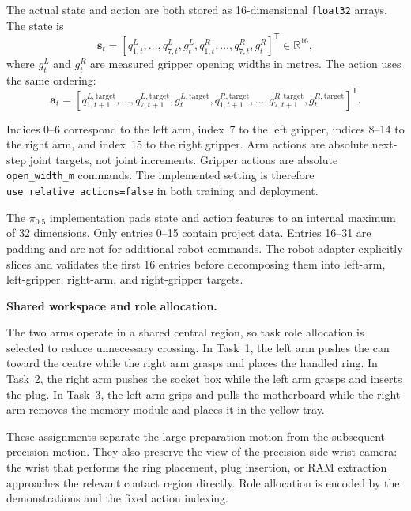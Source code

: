 The actual state and action are both stored as 16-dimensional \texttt{float32} arrays. The state is
\begin{equation}
\mathbf{s}_t=
\left[
q^{L}_{1,t},\ldots,q^{L}_{7,t},g^{L}_t,
q^{R}_{1,t},\ldots,q^{R}_{7,t},g^{R}_t
\right]^{\mathsf T}
\in\mathbb{R}^{16},
\label{eq:ch4-bimanual-state}
\end{equation}
where \(g^{L}_t\) and \(g^{R}_t\) are measured gripper opening widths in metres. The action uses the same ordering:
\begin{equation}
\mathbf{a}_t=
\left[
q^{L,\mathrm{target}}_{1,t+1},\ldots,q^{L,\mathrm{target}}_{7,t+1},
g^{L,\mathrm{target}}_t,
q^{R,\mathrm{target}}_{1,t+1},\ldots,q^{R,\mathrm{target}}_{7,t+1},
g^{R,\mathrm{target}}_t
\right]^{\mathsf T}.
\label{eq:ch4-bimanual-action}
\end{equation}

Indices 0--6 correspond to the left arm, index~7 to the left gripper, indices 8--14 to the right arm, and index~15 to the right gripper. Arm actions are absolute next-step joint targets, not joint increments. Gripper actions are absolute \texttt{open\_width\_m} commands. The implemented setting is therefore \texttt{use\_relative\_actions=false} in both training and deployment.

The $\pi_{0.5}$ implementation pads state and action features to an internal maximum of 32 dimensions. Only entries 0--15 contain project data. Entries 16--31 are padding and are not for additional robot commands. The robot adapter explicitly slices and validates the first 16 entries before decomposing them into left-arm, left-gripper, right-arm, and right-gripper targets.

\medskip
\noindent\textbf{Shared workspace and role allocation.}

The two arms operate in a shared central region, so task role allocation is selected to reduce unnecessary crossing. In Task~1, the left arm pushes the can toward the centre while the right arm grasps and places the handled ring. In Task~2, the right arm pushes the socket box while the left arm grasps and inserts the plug. In Task~3, the left arm grips and pulls the motherboard while the right arm removes the memory module and places it in the yellow tray.

These assignments separate the large preparation motion from the subsequent precision motion. They also preserve the view of the precision-side wrist camera: the wrist that performs the ring placement, plug insertion, or RAM extraction approaches the relevant contact region directly. Role allocation is encoded by the demonstrations and the fixed action indexing.

